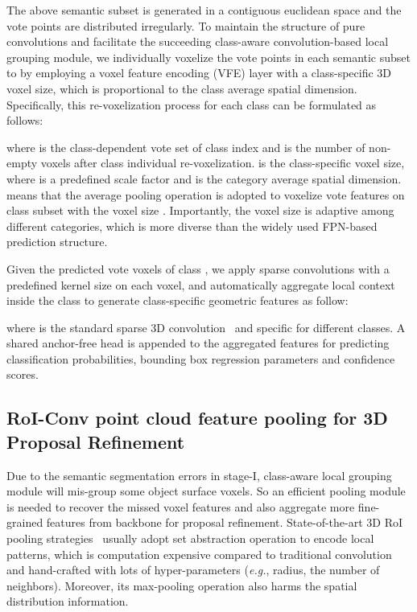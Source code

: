 \documentclass{article}
\begin{document}
The above semantic subset is generated in a contiguous euclidean space and the vote points are distributed irregularly. 
To maintain the structure of pure convolutions and facilitate the succeeding class-aware convolution-based local grouping module, we individually voxelize the vote points in each semantic subset to   by employing a voxel feature encoding (VFE) layer with a class-specific 3D voxel size, which is proportional to the class average spatial dimension. Specifically, this re-voxelization process for each class can be formulated as follows:

where  is the class-dependent vote set of class index  and  is the number of non-empty voxels after class individual re-voxelization.  is the class-specific voxel size, where  is a predefined scale factor and  is the category average spatial dimension.  means that the average pooling operation is adopted to voxelize vote features on  class subset with the voxel size . Importantly, the voxel size is adaptive among different categories, which is more diverse than the widely used FPN-based prediction structure.

Given the predicted vote voxels of  class , we apply sparse convolutions with a predefined kernel size  on each voxel, and automatically aggregate local context inside the class to generate class-specific geometric features  as follow:

where  is the standard sparse 3D convolution~\cite{graham20183d} and specific for different classes. 
A shared anchor-free head is appended to the aggregated features for predicting classification probabilities, bounding box regression parameters and confidence scores.

\subsection{RoI-Conv point cloud feature pooling for 3D Proposal Refinement}\label{sec:refine}
Due to the semantic segmentation errors in stage-I, class-aware local grouping module will mis-group some object surface voxels. So an efficient pooling module is needed to recover the missed voxel features and also aggregate more fine-grained features from backbone for proposal refinement. 
State-of-the-art 3D RoI pooling strategies~\cite{shi2020pv,deng2020voxel} usually adopt set abstraction operation to encode local patterns, which is computation expensive compared to traditional convolution and hand-crafted with lots of hyper-parameters (\textit{e.g.}, radius, the number of neighbors). Moreover, its max-pooling operation also harms the spatial distribution information. 
\end{document}
